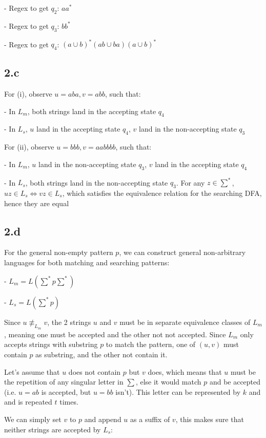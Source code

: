 \documentclass{article}
\begin{document}
- Regex to get $q_2$: $aa^*$

- Regex to get $q_3$: $bb^*$

- Regex to get $q_4$: $(a \cup b)^*(ab\cup ba)(a \cup b)^*$

\subsection*{2.c}

For (i), observe $u=aba, v=abb$, such that:

- In $L_m$, both strings land in the accepting state $q_4$

- In $L_s$, $u$ land in the accepting state $q_4$, $v$ land in the non-accepting state $q_3$

For (ii), observe $u=bbb, v=aabbbb$, such that:

- In $L_m$, $u$ land in the non-accepting state $q_3$, $v$ land in the accepting state $q_4$

- In $L_s$, both strings land in the non-accepting state $q_3$. For any $z \in \sum^*$, $uz \in L_s \iff vz \in L_s$, which satisfies the equivalence relation for the searching DFA, hence they are equal

\subsection*{2.d}

For the general non-empty pattern $p$, we can construct general non-arbitrary languages for both matching and searching patterns:

- $L_m = L(\sum^*p\sum^*)$

- $L_s = L(\sum^*p)$

Since $u \not\equiv_{L_m} v$, the 2 strings $u$ and $v$ must be in separate equivalence classes of $L_m$, meaning one must be accepted and the other not not accepted. Since $L_m$ only accepts strings with substring $p$ to match the pattern, one of $(u, v)$ must contain $p$ as substring, and the other not contain it. 

Let's assume that $u$ does not contain $p$ but $v$ does, which means that $u$ must be the repetition of any singular letter in $\sum$, else it would match $p$ and be accepted (i.e. $u=ab$ is accepted, but $u=bb$ isn't). This letter can be represented by $k$ and and is repeated $t$ times. 

We can simply set $v$ to $p$ and append $u$ as a suffix of $v$, this makes sure that neither strings are accepted by $L_s$:
\end{document}
